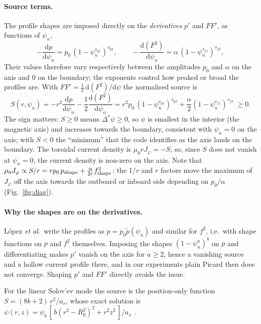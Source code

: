 \documentclass[11pt,a4paper]{article}
\newcommand{\dd}{\mathrm{d}}
\newcommand{\Dstar}{\Delta^{\!*}}
\newcommand{\pn}{\psi_n}
\begin{document}
\paragraph{Source terms.} The profile shapes are imposed directly on the \emph{derivatives} $p'$ and $FF'$, as functions of $\pn$,
\begin{equation}
-\frac{\dd p}{\dd\pn}=p_0\,(1-\pn^{s_{p1}})^{s_{p2}},\qquad
-\frac{\dd (F^2)}{\dd\pn}=\alpha\,(1-\pn^{s_{f1}})^{s_{f2}},
\end{equation}
Their values therefore vary respectively between the amplitudes $p_0$ and $\alpha$ on the axis and $0$ on the boundary; the exponents control how peaked or broad the profiles are. With $FF'=\tfrac12\,\dd(F^2)/\dd\psi$ the normalised source is
\begin{equation}
S(r,\pn)=-r^2\frac{\dd p}{\dd\pn}-\frac12\frac{\dd (F^2)}{\dd\pn}=r^2p_0\,(1-\pn^{s_{p1}})^{s_{p2}}+\frac{\alpha}{2}(1-\pn^{s_{f1}})^{s_{f2}}\;\ge 0 .
\label{eq:picardsrc}
\end{equation}
The sign matters: $S\ge0$ means $\Dstar\psi\ge0$, so $\psi$ is smallest in the interior (the magnetic axis) and increases towards the boundary, consistent with $\pn=0$ on the axis; with $S<0$ the ``minimum'' that the code identifies as the axis lands on the boundary. The toroidal current density is $\mu_0rJ_\varphi=-S$, so, since $S$ does not vanish at $\pn=0$, the current density is non-zero on the axis. Note that $\mu_0J_\varphi\propto S/r=rp_0\,p_{\rm shape}+\tfrac{\alpha}{2r}f^2_{\rm shape}$: the $1/r$ and $r$ factors move the maximum of $J_\varphi$ off the axis towards the outboard or inboard side depending on $p_0/\alpha$ (Fig.~\ref{fig:diag}).

\paragraph{Why the shapes are on the derivatives.} L\'opez \emph{et al.}\ write the profiles as $p=p_0\tilde p(\pn)$ and similar for $f^2$, i.e.\ with shape functions on $p$ and $f^2$ themselves. Imposing the shapes $(1-\pn^{a})^{b}$ on $p$ and differentiating makes $p'$ vanish on the axis for $a\ge2$, hence a vanishing source and a hollow current profile there, and in our experiments plain Picard then does not converge. Shaping $p'$ and $FF'$ directly avoids the issue. 

For the linear Solov'ev mode the source is the position-only function $S=(8b+2)\,r^2/a_s$, whose exact solution is $\psi(r,z)=\psi_b\,[\,b(r^2-R_0^2)^2+r^2z^2\,]/a_s$~\cite{lopez2019}.
\end{document}
